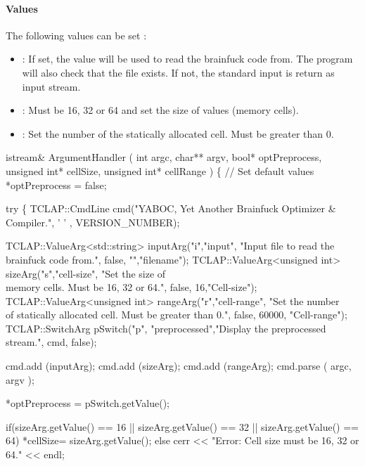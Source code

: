 \paragraph{Values}
The following values can be set :
\begin{itemize}
        \item {} : If set, the value will be used to read the 
  brainfuck code from. The program will also check that the file exists. If 
  not, the standard input is return as input stream.
        \item {} : Must be 16, 32 or 64 and set the size of values 
  (memory cells).\ti
        \item {} : Set the number of the statically allocated cell. 
  Must be greater than 0.\ti
\end{itemize}

\nwenddocs{}\endmoddef\nwstartdeflinemarkup\nwenddeflinemarkup
istream& ArgumentHandler
  (
  int argc, 
  char** argv, 
  bool* optPreprocess, 
  unsigned int* cellSize, 
  unsigned int* cellRange
  ) \{
        // Set default values
        *optPreprocess = false;

        try \{
                TCLAP::CmdLine cmd("YABOC, Yet Another Brainfuck Optimizer & Compiler.", ' ' , VERSION_NUMBER);

                TCLAP::ValueArg<std::string> inputArg("i","input", "Input file to read the brainfuck code from.", false, "","filename");
                TCLAP::ValueArg<unsigned int> sizeArg("s","cell-size", "Set the size of \\
    memory cells. Must be 16, 32 or 64.", false, 16,"Cell-size");
                TCLAP::ValueArg<unsigned int> rangeArg("r","cell-range", "Set the number \\
    of statically allocated cell. Must be greater than 0.", false, 60000,
    "Cell-range");
                TCLAP::SwitchArg pSwitch("p", "preprocessed","Display the preprocessed stream.", cmd, false);

                cmd.add (inputArg);
                cmd.add (sizeArg);
                cmd.add (rangeArg);
                cmd.parse ( argc, argv );

                *optPreprocess = pSwitch.getValue();

    if(sizeArg.getValue() == 16 
    || sizeArg.getValue() == 32 
    || sizeArg.getValue() == 64) *cellSize= sizeArg.getValue();
    else cerr << "Error: Cell size must be 16, 32 or 64." << endl;

